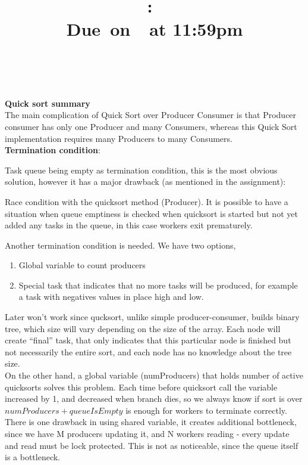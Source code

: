 \documentclass{article}
\title{
    \vspace{2in}
    \textmd{\textbf{\hmwkClass:\ \hmwkTitle}}\\
    \normalsize\vspace{0.1in}\small{Due\ on\ \hmwkDueDate\ at 11:59pm}\\
    \vspace{0.1in}\large{\textit{\hmwkClassInstructor\ \hmwkClassTime}}
    \vspace{3in}
}
\author{\textbf{\hmwkAuthorName}}
\date{}
\begin{document}
\maketitle

\pagebreak

\textbf{Quick sort summary}\\
The main complication of Quick Sort over Producer Consumer is that Producer consumer has only
one Producer and many Consumers, whereas this Quick Sort implementation requires many Producers
to many Consumers.\\

\textbf{Termination condition}: 

Task queue being empty as termination condition, this is the most obvious
solution, however it has a major drawback (as mentioned in the assignment):

Race condition with the quicksort method (Producer). It is possible to have a situation
when queue emptiness is checked when quicksort is started but not yet added any tasks in
the queue, in this case workers exit prematurely.

Another termination condition is needed. We have two options, 
\begin{enumerate}[1.]
\item Global variable to count producers
\item Special task that indicates that no more tasks will be produced, for example a task with negatives
values in place high and low. 
\end{enumerate}
Later won't work since qucksort, unlike simple producer-consumer, builds binary tree, which size will vary depending 
on the size of the array. Each node will create ``final'' task, that only
indicates that this particular node is finished but not necessarily the entire sort, and each
node has no knowledge about the tree size.\\

On the other hand, a global variable (numProducers) that holds number of active quicksorts solves this problem. Each time before
quicksort call the variable increased by 1, and decreased when branch dies, so we always know
if sort is over $numProducers + queueIsEmpty$ is enough for workers to terminate correctly. 
There is one drawback in using shared
variable, it creates additional bottleneck, since we have M producers updating it, and N workers
reading - every update and read must be lock protected. This is not as noticeable, since the
queue itself is a bottleneck.
\\
\end{document}

